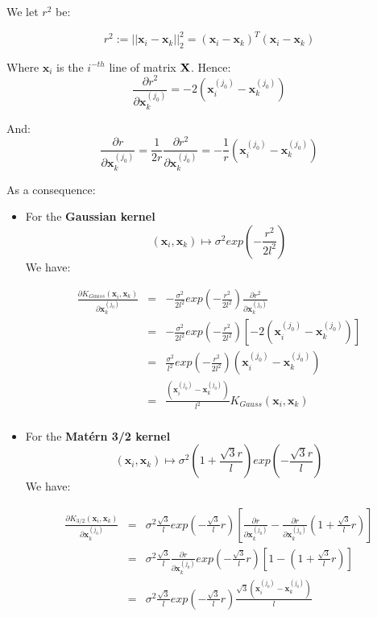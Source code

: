 \medskip

We let $r^2$ be:

$$
r^2 := || \textbf{x}_i - \textbf{x}_k ||^2_2 = (\textbf{x}_i - \textbf{x}_k)^T(\textbf{x}_i - \textbf{x}_k)
$$

Where $\textbf{x}_i$ is the $i^{-th}$ line of matrix ${\bf X}$. Hence:
$$
\frac{\partial r^2}{\partial \textbf{x}_k^{(j_0)}} = -2\left(\textbf{x}_i^{(j_0)} - \textbf{x}_k^{(j_0)} \right)
$$

And:
$$
\frac{\partial r}{\partial \textbf{x}_k^{(j_0)}} = \frac{1}{2r}\frac{\partial r^2}{\partial \textbf{x}_k^{(j_0)}} = -\frac{1}{r}\left(\textbf{x}_i^{(j_0)} - \textbf{x}_k^{(j_0)} \right)
$$


As a consequence: 

\begin{itemize}

\item For the \textbf{Gaussian kernel} 
$$
(\textbf{x}_i, \textbf{x}_k) \mapsto \sigma^2 exp \left( -\frac{r^2}{2l^2} \right)
$$ 
We have:

\begin{eqnarray*}
\frac{\partial K_{Gauss}(\textbf{x}_i, \textbf{x}_k)}{\partial \textbf{x}_k^{(j_0)}} &=& -\frac{\sigma^2}{2l^2} exp \left(-\frac{r^2}{2l^2} \right) \frac{\partial r^2}{\partial \textbf{x}_k^{(j_0)}}\\
&=& -\frac{\sigma^2}{2l^2} exp \left(-\frac{r^2}{2l^2} \right) \left[ -2\left(\textbf{x}_i^{(j_0)} - \textbf{x}_k^{(j_0)} \right) \right]\\
&=& \frac{\sigma^2}{l^2} exp \left(-\frac{r^2}{2l^2} \right) \left(\textbf{x}_i^{(j_0)} - \textbf{x}_k^{(j_0)} \right) \\
&=& \frac{\left(\textbf{x}_i^{(j_0)} - \textbf{x}_k^{(j_0)} \right)}{l^2} K_{Gauss}(\textbf{x}_i, \textbf{x}_k)\\
\end{eqnarray*}

\item For the \textbf{Mat\'ern 3/2 kernel} 
$$
(\textbf{x}_i, \textbf{x}_k) \mapsto \sigma^2 \left( 1 + \frac{\sqrt{3}r}{l} \right) exp \left( - \frac{\sqrt{3}r}{l} \right)
$$ 
We have:

\begin{eqnarray*}
\frac{\partial K_{3/2}(\textbf{x}_i, \textbf{x}_k)}{\partial \textbf{x}_k^{(j_0)}} &=& \sigma^2 \frac{\sqrt{3}}{l} exp \left( - \frac{\sqrt{3}}{l} r\right) \left[   \frac{\partial r}{\partial \textbf{x}_k^{(j_0)}}  - \frac{\partial r}{\partial \textbf{x}_k^{(j_0)}} \left( 1 + \frac{\sqrt{3}}{l}r \right) \right]\\
&=&  \sigma^2 \frac{\sqrt{3}}{l} \frac{\partial r}{\partial \textbf{x}_k^{(j_0)}} exp \left( - \frac{\sqrt{3}}{l} r\right) \left[1  -  \left( 1 + \frac{\sqrt{3}}{l}r \right) \right]\\
&=& \sigma^2 \frac{\sqrt{3}}{l} exp \left( - \frac{\sqrt{3}}{l} r\right) \frac{\sqrt{3}\left(\textbf{x}_i^{(j_0)} - \textbf{x}_k^{(j_0)} \right)}{l} \\
\end{eqnarray*}


\end{itemize}
